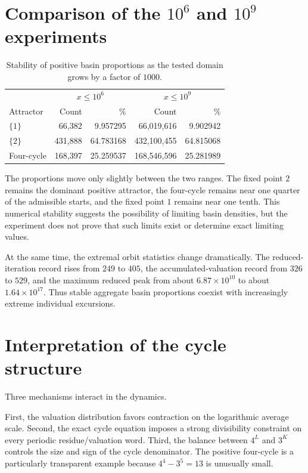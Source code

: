 \documentclass[11pt]{article}
\begin{document}
\section{Comparison of the $10^6$ and $10^9$ experiments}
\begin{table}[ht]
\centering
\caption{Stability of positive basin proportions as the tested domain grows by a factor of $1000$.}
\label{tab:compare}
\begin{tabular}{lrrrr}
\toprule
& \multicolumn{2}{c}{$x\le10^6$} & \multicolumn{2}{c}{$x\le10^9$}\\
Attractor & Count & \% & Count & \%\\
\midrule
$\{1\}$ & 66,382 & 9.957295 & 66,019,616 & 9.902942\\
$\{2\}$ & 431,888 & 64.783168 & 432,100,455 & 64.815068\\
Four-cycle & 168,397 & 25.259537 & 168,546,596 & 25.281989\\
\bottomrule
\end{tabular}
\end{table}

The proportions move only slightly between the two ranges.  The fixed point $2$ remains the dominant positive attractor, the four-cycle remains near one quarter of the admissible starts, and the fixed point $1$ remains near one tenth.  This numerical stability suggests the possibility of limiting basin densities, but the experiment does not prove that such limits exist or determine exact limiting values.

At the same time, the extremal orbit statistics change dramatically.  The reduced-iteration record rises from $249$ to $405$, the accumulated-valuation record from $326$ to $529$, and the maximum reduced peak from about $6.87\times10^{10}$ to about $1.64\times10^{17}$.  Thus stable aggregate basin proportions coexist with increasingly extreme individual excursions.

\section{Interpretation of the cycle structure}
Three mechanisms interact in the dynamics.

First, the valuation distribution favors contraction on the logarithmic average scale.  Second, the exact cycle equation imposes a strong divisibility constraint on every periodic residue/valuation word.  Third, the balance between $4^L$ and $3^K$ controls the size and sign of the cycle denominator.  The positive four-cycle is a particularly transparent example because $4^4-3^5=13$ is unusually small.
\end{document}
